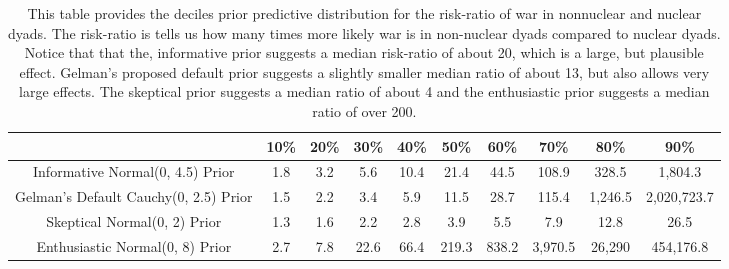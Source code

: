 \begin{table}[H]
\centering
{\scriptsize
\begin{tabular}{|cccccccccc|}
  \hline
 & 10\% & 20\% & 30\% & 40\% & 50\% & 60\% & 70\% & 80\% & 90\% \\ 
  \hline
Informative Normal(0, 4.5) Prior &         1.8 &         3.2 &         5.6 &        10.4 &        21.4 &        44.5 &       108.9 &       328.5 &     1,804.3 \\ 
  Gelman's Default Cauchy(0, 2.5) Prior &         1.5 &         2.2 &         3.4 &         5.9 &        11.5 &        28.7 &       115.4 &     1,246.5 & 2,020,723.7 \\ 
  Skeptical Normal(0, 2) Prior &         1.3 &         1.6 &         2.2 &         2.8 &         3.9 &         5.5 &         7.9 &        12.8 &        26.5 \\ 
  Enthusiastic Normal(0, 8) Prior &         2.7 &         7.8 &        22.6 &        66.4 &       219.3 &       838.2 &     3,970.5 &      26,290 &   454,176.8 \\ 
   \hline
\end{tabular}
}
\caption{This table provides the deciles prior predictive distribution for the 
                  risk-ratio of war in nonnuclear and nuclear dyads. The risk-ratio is 
                  tells us how many times more likely war is in non-nuclear dyads compared 
                  to nuclear dyads. Notice that that the, informative prior suggests a median 
                  risk-ratio of about 20, which is a large, but plausible effect. Gelman's 
                  proposed default prior suggests a slightly smaller median ratio of about 13, 
                  but also allows very large effects. The skeptical prior suggests a median 
                  ratio of about 4 and the enthusiastic prior suggests a median ratio of over 
                  200.} 
\label{tab:bm-pppd-deciles}
\end{table}
